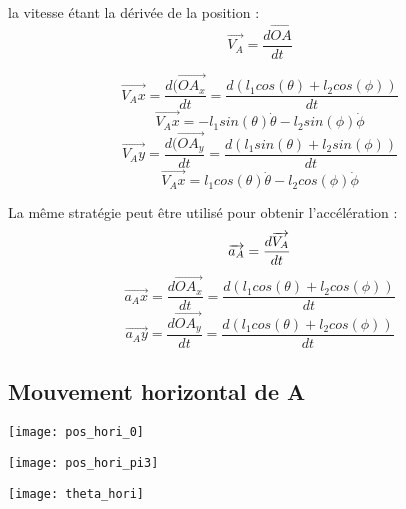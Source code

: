\documentclass{udes_rapport} %
\begin{document}
la vitesse étant la dérivée de la position :
\begin{equation}
\overrightarrow{V_A} = \frac{d\overrightarrow{OA}}{dt}
\end{equation}

\[ \overrightarrow{V_Ax} = \frac{d(\overrightarrow{OA_x}}{dt} = \frac{d(l_1 cos(\theta) + l_2 cos(\phi))}{dt}	\]
\[ \overrightarrow{V_Ax} = -l_1 sin(\theta) \dot{\theta} -l_2 sin(\phi) \dot{\phi}								\]
\[ \overrightarrow{V_Ay} = \frac{d(\overrightarrow{OA_y}}{dt} = \frac{d(l_1 sin(\theta) + l_2 sin(\phi))}{dt}	\]
\[ \overrightarrow{V_Ax} = l_1 cos(\theta) \dot{\theta} -l_2 cos(\phi) \dot{\phi}								\]


La même stratégie peut être utilisé pour obtenir l'accélération :
\begin{equation}
\overrightarrow{a_A} = \frac{d\overrightarrow{V_A}}{dt}	\\
\end{equation}
\[	\overrightarrow{a_Ax} = \frac{d\overrightarrow{OA_x}}{dt} = \frac{ d(l_1 cos(\theta) + l_2 cos(\phi))}{dt}		\]
\[	\overrightarrow{a_Ay} = \frac{d\overrightarrow{OA_y}}{dt} = \frac{d(l_1 cos(\theta) + l_2 cos(\phi))}{dt}		\]

\subsection{Mouvement horizontal de A}

\noindent\begin{minipage}{\textwidth} 
\begin{minipage}{0.5\textwidth}
  \centering
  \texttt{[image: pos\_hori\_0]}
  \label{pos_hori:position_horizontal_initiale}
\end{minipage}%
\begin{minipage}{0.5\textwidth}
  \centering 
  \texttt{[image: pos\_hori\_pi3]} 
  \label{pos_hori:position_horizontal_finale} 
\end{minipage} 
\label{pos_hori} 
\end{minipage}


\begin{center}
	\centering
	\texttt{[image: theta\_hori]}
	\label{composantes_horizontale_theta}
\end{center}
\end{document}
